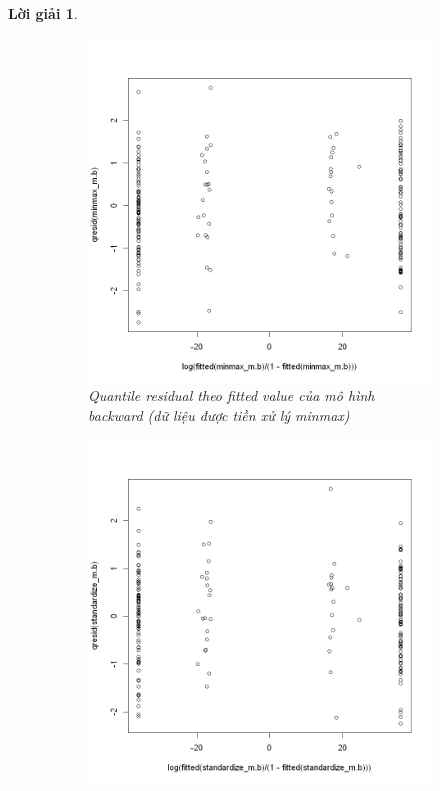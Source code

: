 \documentclass[14pt, a4paper]{article}
\theoremstyle{sltheorem}
\theoremstyle{soltheorem}
\newtheorem*{loigiai}{Lời giải}
\begin{document}
\begin{loigiai}
    \begin{figure}[h!]
        \centering
        \begin{subfigure}[b]{0.4\textwidth}
            \centering
            \includegraphics[width=\textwidth]{figures/minmax_mb_fitted.png}
            \caption{Quantile residual theo fitted value của mô hình backward (dữ liệu được tiền xử lý minmax)}
        \end{subfigure}
        \hfill
        \begin{subfigure}[b]{0.4\textwidth}
            \centering
            \includegraphics[width=\textwidth]{figures/standardize_mb_fitted.png}

\end{subfigure}
\end{figure}
\end{loigiai}
\end{document}
